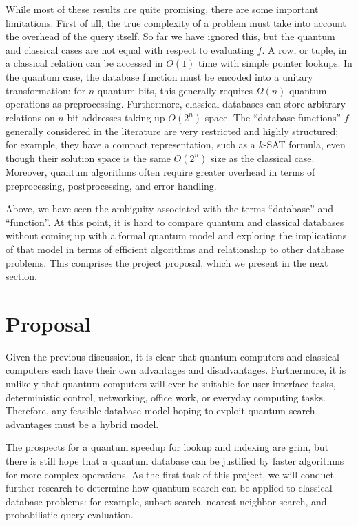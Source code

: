 \documentclass{toc}
\theoremstyle{plain}
\theoremstyle{definition}
\begin{document}
While most of these results are quite promising, there are some
important limitations. First of all, the true complexity of a problem must
take into account the overhead of the query itself. So far we have ignored
this, but the quantum and classical cases are not equal with respect to
evaluating $f$. A row, or tuple, in a classical relation can be accessed
in $O(1)$ time with simple pointer lookups. In the quantum case, the
database function must be encoded into a unitary transformation: for
$n$ quantum bits, this generally requires $\Omega(n)$ quantum operations
as preprocessing. Furthermore, classical databases can store arbitrary
relations on $n$-bit addresses taking up $O(2^n)$ space. The
``database functions'' $f$ generally considered in the literature are very
restricted and highly structured; for example, they have a compact
representation, such as a $k$-SAT formula, even though their solution space
is the same $O(2^n)$ size as the classical case.
Moreover, quantum algorithms often require greater
overhead in terms of preprocessing, postprocessing, and error handling.

Above, we have seen the ambiguity associated with the terms ``database''
and ``function''.
At this point, it is hard to compare quantum and classical databases without
coming up with a formal quantum model and exploring the implications of
that model in terms of efficient algorithms and relationship to other
database problems. This comprises the project proposal, which we present in
the next section.

\section{Proposal}

Given the previous discussion, it is clear that quantum computers and
classical computers each have their own advantages and disadvantages.
Furthermore, it is unlikely that quantum computers will ever be suitable
for user interface tasks, deterministic control, networking, office work,
or everyday computing tasks. Therefore, any feasible database model hoping
to exploit quantum search advantages must be a hybrid model.

The prospects for a quantum speedup for lookup and indexing are grim,
but there is still hope that a quantum database can be justified by
faster algorithms for more complex operations.
As the first task of this project, we will conduct further research to
determine how quantum search can
be applied to classical database problems: for example, subset search,
nearest-neighbor search, and probabilistic query evaluation.
\end{document}
